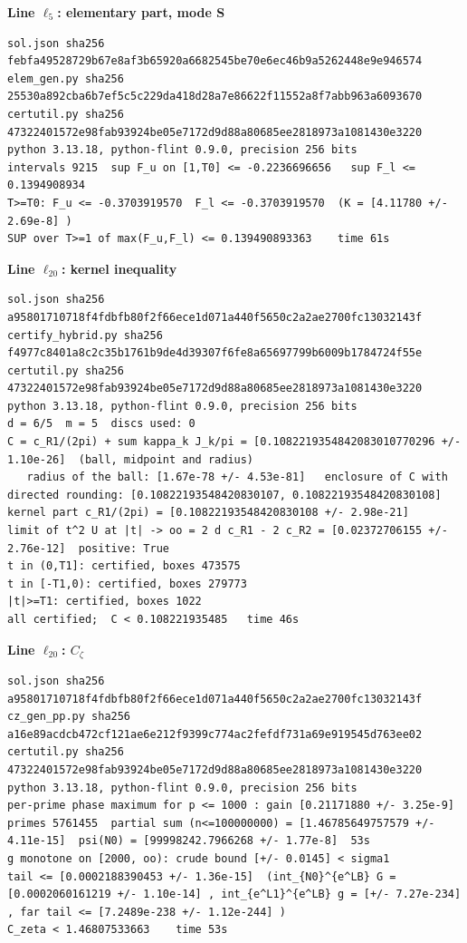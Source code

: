 \documentclass[11pt,reqno]{amsart}
\numberwithin{equation}{section}
\theoremstyle{definition}
\theoremstyle{remark}
\newcommand{\appsub}[1]{\par\medskip\noindent\textbf{#1}\par\nobreak\smallskip}
\begin{document}
\appsub{Line $\ell_{5}$: elementary part, mode S}
\begin{lstlisting}
sol.json sha256 febfa49528729b67e8af3b65920a6682545be70e6ec46b9a5262448e9e946574
elem_gen.py sha256 25530a892cba6b7ef5c5c229da418d28a7e86622f11552a8f7abb963a6093670
certutil.py sha256 47322401572e98fab93924be05e7172d9d88a80685ee2818973a1081430e3220
python 3.13.18, python-flint 0.9.0, precision 256 bits
intervals 9215  sup F_u on [1,T0] <= -0.2236696656   sup F_l <= 0.1394908934
T>=T0: F_u <= -0.3703919570  F_l <= -0.3703919570  (K = [4.11780 +/- 2.69e-8] )
SUP over T>=1 of max(F_u,F_l) <= 0.139490893363    time 61s
\end{lstlisting}
\appsub{Line $\ell_{20}$: kernel inequality}
\begin{lstlisting}
sol.json sha256 a95801710718f4fdbfb80f2f66ece1d071a440f5650c2a2ae2700fc13032143f
certify_hybrid.py sha256 f4977c8401a8c2c35b1761b9de4d39307f6fe8a65697799b6009b1784724f55e
certutil.py sha256 47322401572e98fab93924be05e7172d9d88a80685ee2818973a1081430e3220
python 3.13.18, python-flint 0.9.0, precision 256 bits
d = 6/5  m = 5  discs used: 0 
C = c_R1/(2pi) + sum kappa_k J_k/pi = [0.1082219354842083010770296 +/- 1.10e-26]  (ball, midpoint and radius)
   radius of the ball: [1.67e-78 +/- 4.53e-81]   enclosure of C with directed rounding: [0.10822193548420830107, 0.10822193548420830108]
kernel part c_R1/(2pi) = [0.10822193548420830108 +/- 2.98e-21]
limit of t^2 U at |t| -> oo = 2 d c_R1 - 2 c_R2 = [0.02372706155 +/- 2.76e-12]  positive: True
t in (0,T1]: certified, boxes 473575
t in [-T1,0): certified, boxes 279773
|t|>=T1: certified, boxes 1022
all certified;  C < 0.108221935485   time 46s
\end{lstlisting}
\appsub{Line $\ell_{20}$: $C_\zeta$}
\begin{lstlisting}
sol.json sha256 a95801710718f4fdbfb80f2f66ece1d071a440f5650c2a2ae2700fc13032143f
cz_gen_pp.py sha256 a16e89acdcb472cf121ae6e212f9399c774ac2fefdf731a69e919545d763ee02
certutil.py sha256 47322401572e98fab93924be05e7172d9d88a80685ee2818973a1081430e3220
python 3.13.18, python-flint 0.9.0, precision 256 bits
per-prime phase maximum for p <= 1000 : gain [0.21171880 +/- 3.25e-9]
primes 5761455  partial sum (n<=100000000) = [1.46785649757579 +/- 4.11e-15]  psi(N0) = [99998242.7966268 +/- 1.77e-8]  53s
g monotone on [2000, oo): crude bound [+/- 0.0145] < sigma1
tail <= [0.0002188390453 +/- 1.36e-15]  (int_{N0}^{e^LB} G = [0.0002060161219 +/- 1.10e-14] , int_{e^L1}^{e^LB} g = [+/- 7.27e-234] , far tail <= [7.2489e-238 +/- 1.12e-244] )
C_zeta < 1.46807533663    time 53s
\end{lstlisting}
\end{document}
